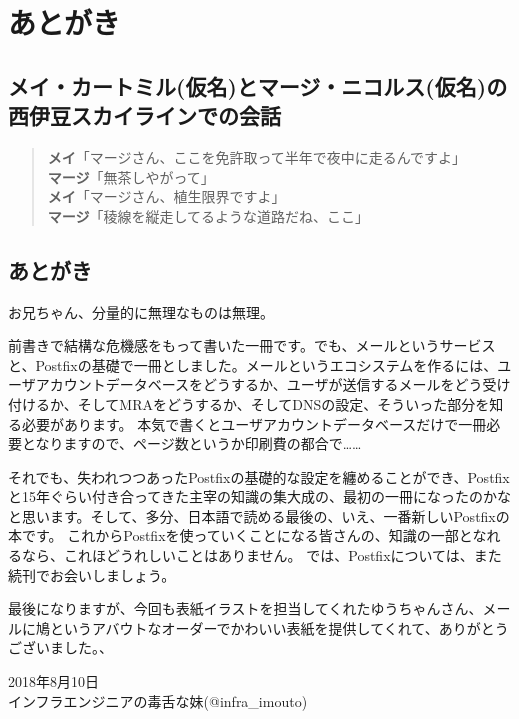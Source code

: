 \chapter{あとがき}

\section*{メイ・カートミル(仮名)とマージ・ニコルス(仮名)の西伊豆スカイラインでの会話}

\begin{quotation}
\noindent
{\bf メイ}「マージさん、ここを免許取って半年で夜中に走るんですよ」\\
{\bf マージ}「無茶しやがって」 \\
{\bf メイ}「マージさん、植生限界ですよ」 \\
{\bf マージ}「稜線を縦走してるような道路だね、ここ」 \\
\end{quotation}

\section*{あとがき}

お兄ちゃん、分量的に無理なものは無理。

前書きで結構な危機感をもって書いた一冊です。でも、メールというサービスと、Postfixの基礎で一冊としました。メールというエコシステムを作るには、ユーザアカウントデータベースをどうするか、ユーザが送信するメールをどう受け付けるか、そしてMRAをどうするか、そしてDNSの設定、そういった部分を知る必要があります。
本気で書くとユーザアカウントデータベースだけで一冊必要となりますので、ページ数というか印刷費の都合で……

それでも、失われつつあったPostfixの基礎的な設定を纏めることができ、Postfixと15年ぐらい付き合ってきた主宰の知識の集大成の、最初の一冊になったのかなと思います。そして、多分、日本語で読める最後の、いえ、一番新しいPostfixの本です。
これからPostfixを使っていくことになる皆さんの、知識の一部となれるなら、これほどうれしいことはありません。
では、Postfixについては、また続刊でお会いしましょう。

最後になりますが、今回も表紙イラストを担当してくれたゆうちゃんさん、メールに鳩というアバウトなオーダーでかわいい表紙を提供してくれて、ありがとうございました。、

\begin{flushright}
2018年8月10日 \\
インフラエンジニアの毒舌な妹(@infra\_imouto)
\end{flushright}

